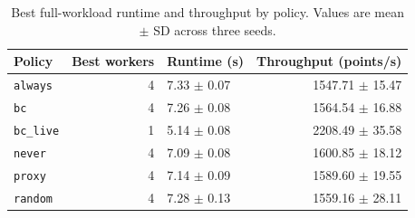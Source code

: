 \begin{table}[H]
\centering
\caption{Best full-workload runtime and throughput by policy. Values are mean $\pm$ SD across three seeds.}
\label{tab:runtime_full_workload}
\footnotesize
\setlength{\tabcolsep}{3pt}
\begin{tabular}{lrlr}
\toprule
Policy & Best workers & Runtime (s) & Throughput (points/s) \\
\midrule
\texttt{always} & 4 & 7.33 $\pm$ 0.07 & 1547.71 $\pm$ 15.47 \\
\texttt{bc} & 4 & 7.26 $\pm$ 0.08 & 1564.54 $\pm$ 16.88 \\
\texttt{bc\_live} & 1 & 5.14 $\pm$ 0.08 & 2208.49 $\pm$ 35.58 \\
\texttt{never} & 4 & 7.09 $\pm$ 0.08 & 1600.85 $\pm$ 18.12 \\
\texttt{proxy} & 4 & 7.14 $\pm$ 0.09 & 1589.60 $\pm$ 19.55 \\
\texttt{random} & 4 & 7.28 $\pm$ 0.13 & 1559.16 $\pm$ 28.11 \\
\bottomrule
\end{tabular}
\end{table}
